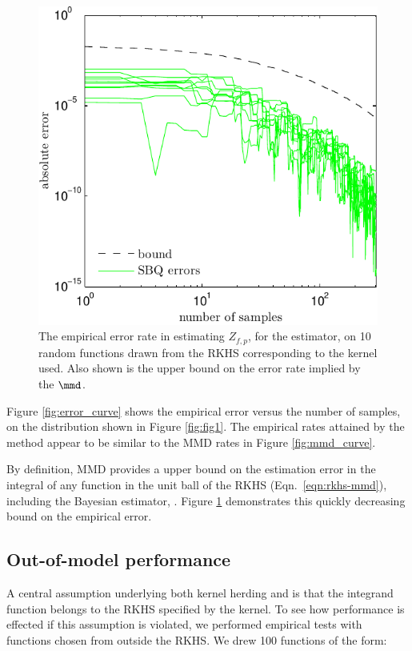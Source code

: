 \begin{figure}[t]
\centering
\includegraphics[width=.8\columnwidth]{figs/herding/bound_curve_rkhs}
\caption[Illustrating MMD as an upper bound on empirical error rate]{The empirical error rate in estimating $Z_{f,p}$,  for the \sbq{} estimator, on 10 random functions drawn from the RKHS corresponding to the kernel used. Also shown is the upper bound on the error rate implied by the $\mmd$.}
\label{fig:bound_curve}
\end{figure}

Figure \ref{fig:error_curve} shows the empirical error versus the number of samples, on the distribution shown in Figure \ref{fig:fig1}. The empirical rates attained by the method appear to be similar to the MMD rates in Figure \ref{fig:mmd_curve}.

By definition, MMD provides a upper bound on the estimation error in the integral of any function in the unit ball of the RKHS (Eqn.\ \eqref{eqn:rkhs-mmd}), including the Bayesian estimator, \sbq{}. Figure \ref{fig:bound_curve} demonstrates this quickly decreasing bound on the \sbq{} empirical error.

\subsection{Out-of-model performance}

A central assumption underlying both kernel herding and\sbq{} is that the integrand function belongs to the RKHS specified by the kernel. To see how performance is effected if this assumption is violated, we performed empirical tests with functions chosen from outside the RKHS. We drew 100 functions of the form:

